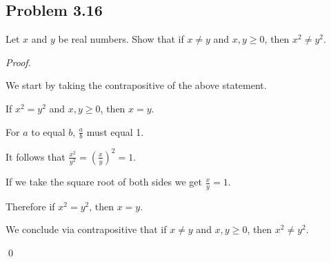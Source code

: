 \documentclass{article}
\begin{document}
\pagebreak
\subsection{Problem 3.16}
Let $x$ and $y$ be real numbers. Show that if $x \neq y$ and $x,y \geq 0$, then $x^2 \neq y^2$.

\textit{Proof.}
\begin{addmargin}[0.75cm]{0cm}
	We start by taking the contrapositive of the above statement.
	
	If $x^2 = y^2$ and $x,y \geq 0$, then $x = y$.
	
	For $a$ to equal $b$, $\frac{a}{b}$ must equal 1.
	
	It follows that $\frac{x^2}{y^2}=(\frac{x}{y})^2=1$.
	
	If we take the square root of both sides we get $\frac{x}{y}=1$.
	
	Therefore if $x^2=y^2$, then $x=y$.
	
	We conclude via contrapositive that if $x \neq y$ and $x,y \geq 0$, then $x^2 \neq y^2$.
	
	\qed
\end{addmargin}
\end{document}
